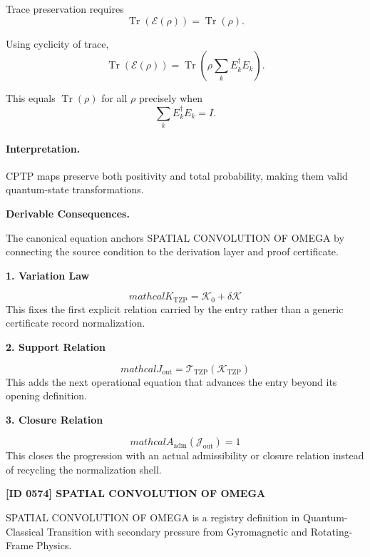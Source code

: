 Trace preservation requires
\begin{equation}
\operatorname{Tr}(\mathcal{E}(\rho))=\operatorname{Tr}(\rho).
\end{equation}

Using cyclicity of trace,
\begin{equation}
\operatorname{Tr}(\mathcal{E}(\rho))
=
\operatorname{Tr}\left(
\rho\sum_k E_k^\dagger E_k
\right).
\end{equation}

This equals $\operatorname{Tr}(\rho)$ for all $\rho$ precisely when
\begin{equation}
\boxed{
\sum_k E_k^\dagger E_k = I .
}
\end{equation}

\paragraph{Interpretation.}
CPTP maps preserve both positivity and total probability, making them valid quantum-state transformations.

\par\vspace{0.35em}
\noindent\textbf{Derivable Consequences.}\quad
\begingroup
\footnotesize
\raggedright
The canonical equation anchors SPATIAL CONVOLUTION OF OMEGA by connecting the source condition to the derivation layer and proof certificate.
\par\endgroup

\noindent\textbf{1. Variation Law}\par
\[
mathcal{K}_{\mathrm{TZP}} = \mathcal{K}_0 + \delta \mathcal{K}
\]
\noindent This fixes the first explicit relation carried by the entry rather than a generic certificate record normalization.\par
\noindent\textbf{2. Support Relation}\par
\[
mathcal{J}_{\mathrm{out}} = \mathcal{T}_{\mathrm{TZP}}\!\left(\mathcal{K}_{\mathrm{TZP}}\right)
\]
\noindent This adds the next operational equation that advances the entry beyond its opening definition.\par
\noindent\textbf{3. Closure Relation}\par
\[
mathcal{A}_{\mathrm{adm}}\!\left(\mathcal{J}_{\mathrm{out}}\right)=1
\]
\noindent This closes the progression with an actual admissibility or closure relation instead of recycling the normalization shell.\par

\clearpage
\noindent\textbf{[ID 0574] SPATIAL CONVOLUTION OF OMEGA}\par
\vspace{0.35em}
\begingroup\small
{}
SPATIAL CONVOLUTION OF OMEGA is a registry definition in Quantum-Classical Transition with secondary pressure from Gyromagnetic and Rotating-Frame Physics.

